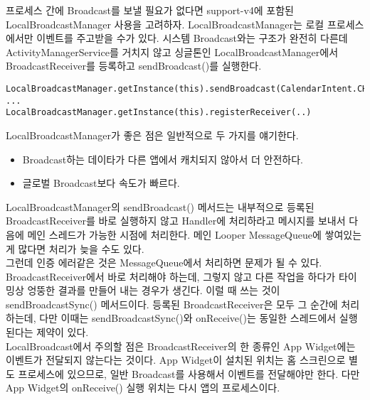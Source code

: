 프로세스 간에 Broadcast를 보낼 필요가 없다면 support-v4에 포함된 LocalBroadcastManager 사용을 고려하자. 
LocalBroadcastManager는 로컬 프로세스에서만 이벤트를 주고받을 수가 있다.
시스템 Broadcast와는 구조가 완전히 다른데 ActivityManagerService를 거치지 않고 싱글톤인 LocalBroadcastManager에서 BroadcastReceiver를 등록하고 sendBroadcast()를 실행한다.

\begin{lstlisting}[frame=single] 
LocalBroadcastManager.getInstance(this).sendBroadcast(CalendarIntent.CHANGE_TIME);
...
LocalBroadcastManager.getInstance(this).registerReceiver(..)
\end{lstlisting}

LocalBroadcastManager가 좋은 점은 일반적으로 두 가지를 얘기한다.
\begin{itemize}
\item Broadcast하는 데이타가 다른 앱에서 캐치되지 않아서 더 안전하다.
\item 글로벌 Broadcast보다 속도가 빠르다.
\end{itemize}

LocalBroadcastManager의 sendBroadcast() 메서드는 내부적으로 등록된 BroadcastReceiver를 바로 실행하지 않고 Handler에 처리하라고 메시지를 보내서 다음에 메인 스레드가 가능한 시점에 처리한다. 메인 Looper MessageQueue에 쌓여있는 게 많다면 처리가 늦을 수도 있다.\\

그런데 인증 에러같은 것은 MessageQueue에서 처리하면 문제가 될 수 있다.
BroadcastReceiver에서 바로 처리해야 하는데, 그렇지 않고 다른 작업을 하다가 타이밍상 엉뚱한 결과를 만들어 내는 경우가 생긴다. 
이럴 때 쓰는 것이 sendBroadcastSync() 메서드이다. 
등록된 BroadcastReceiver은 모두 그 순간에 처리하는데, 다만 이때는 sendBroadcastSync()와 onReceive()는 동일한 스레드에서 실행된다는 제약이 있다.\\

LocalBroadcast에서 주의할 점은 BroadcastReceiver의 한 종류인 App Widget에는 이벤트가 전달되지 않는다는 것이다. App Widget이 설치된 위치는 홈 스크린으로 별도 프로세스에 있으므로, 일반 Broadcast를 사용해서 이벤트를 전달해야만 한다. 다만 App Widget의 onReceive() 실행 위치는 다시 앱의 프로세스이다.

\begin{comment}
별도 스레드내에서 sendBroadcastSync를 할 수 밖에 없다고 하면 onReceive 안에다가 UI를 건드리는 쪽에는 runOnUIThread 해도 되지만 참 번거로운 일이 되네요.

Activity의 runOnUIThread는 호출하는 곳이 uiThread가 아니면 역시 post를 해주고 있어요.
runOnUIThread는 해결책이라고 볼 수가 없네요.

\end{comment}


